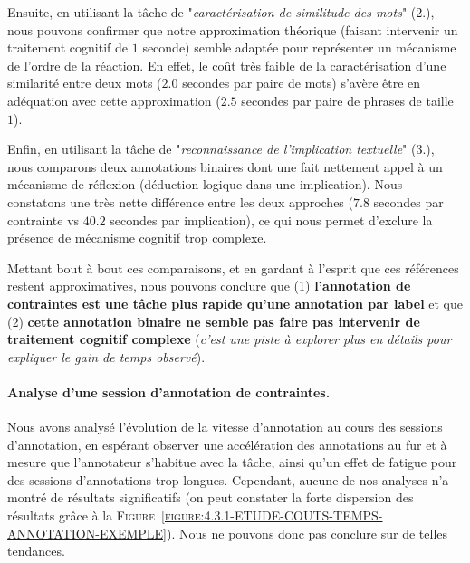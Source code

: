 			Ensuite, en utilisant la tâche de "\textit{caractérisation de similitude des mots}" (2.), nous pouvons confirmer que notre approximation théorique (faisant intervenir un traitement cognitif de $1$ seconde) semble adaptée pour représenter un mécanisme de l'ordre de la réaction.
			En effet, le coût très faible de la caractérisation d'une similarité entre deux mots ($2.0$ secondes par paire de mots) s'avère être en adéquation avec cette approximation ($2.5$ secondes par paire de phrases de taille $1$).
			
			Enfin, en utilisant la tâche de "\textit{reconnaissance de l'implication textuelle}" (3.), nous comparons deux annotations binaires dont une fait nettement appel à un mécanisme de réflexion (déduction logique dans une implication).
			Nous constatons une très nette différence entre les deux approches ($7.8$ secondes par contrainte vs $40.2$ secondes par implication), ce qui nous permet d'exclure la présence de mécanisme cognitif trop complexe.
	
			\begin{leftBarSummary}
				Mettant bout à bout ces comparaisons, et en gardant à l'esprit que ces références restent approximatives, nous pouvons conclure que (1) \textbf{l'annotation de contraintes est une tâche plus rapide qu'une annotation par label} et que (2) \textbf{cette annotation binaire ne semble pas faire pas intervenir de traitement cognitif complexe} (\textit{c'est une piste à explorer plus en détails pour expliquer le gain de temps observé}).
			\end{leftBarSummary}
		
		
		\paragraph{Analyse d'une session d'annotation de contraintes.}
		
			Nous avons analysé l'évolution de la vitesse d'annotation au cours des sessions d'annotation, en espérant observer une accélération des annotations au fur et à mesure que l'annotateur s'habitue avec la tâche, ainsi qu'un effet de fatigue pour des sessions d'annotations trop longues.
			Cependant, aucune de nos analyses n'a montré de résultats significatifs (on peut constater la forte dispersion des résultats grâce à la \textsc{Figure~\ref{figure:4.3.1-ETUDE-COUTS-TEMPS-ANNOTATION-EXEMPLE}}).
			Nous ne pouvons donc pas conclure sur de telles tendances.
			
